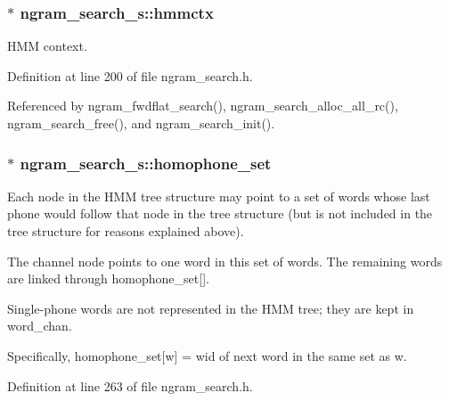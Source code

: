 \subsubsection[{hmmctx}]{$\ast$ {\bf ngram\-\_\-search\-\_\-s\-::hmmctx}}\label{structngram__search__s_acfbdd34e3dadbaa384818402f1dd59bf}


\-H\-M\-M context. 



\-Definition at line 200 of file ngram\-\_\-search.\-h.



\-Referenced by ngram\-\_\-fwdflat\-\_\-search(), ngram\-\_\-search\-\_\-alloc\-\_\-all\-\_\-rc(), ngram\-\_\-search\-\_\-free(), and ngram\-\_\-search\-\_\-init().

\subsubsection[{homophone\-\_\-set}]{$\ast$ {\bf ngram\-\_\-search\-\_\-s\-::homophone\-\_\-set}}\label{structngram__search__s_ab251bb3d0ddd33dd99ed390b61e481f2}


\-Each node in the \-H\-M\-M tree structure may point to a set of words whose last phone would follow that node in the tree structure (but is not included in the tree structure for reasons explained above). 

\-The channel node points to one word in this set of words. \-The remaining words are linked through homophone\-\_\-set[].

\-Single-\/phone words are not represented in the \-H\-M\-M tree; they are kept in word\-\_\-chan.

\-Specifically, homophone\-\_\-set[w] = wid of next word in the same set as w. 

\-Definition at line 263 of file ngram\-\_\-search.\-h.

